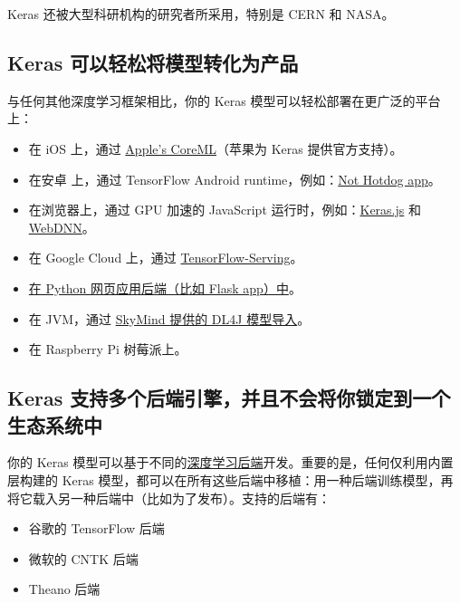 Keras 还被大型科研机构的研究者所采用，特别是 CERN 和 NASA。


\subsection{Keras
可以轻松将模型转化为产品}\label{keras-ux53efux4ee5ux8f7bux677eux5c06ux6a21ux578bux8f6cux5316ux4e3aux4ea7ux54c1}

与任何其他深度学习框架相比，你的 Keras
模型可以轻松部署在更广泛的平台上：

\begin{itemize}
\tightlist
\item
  在 iOS 上，通过
  \href{https://developer.apple.com/documentation/coreml}{Apple's
  CoreML}（苹果为 Keras 提供官方支持）。
\item
  在安卓 上，通过 TensorFlow Android
  runtime，例如：\href{https://medium.com/@timanglade/how-hbos-silicon-valley-built-not-hotdog-with-mobile-tensorflow-keras-react-native-ef03260747f3}{Not
  Hotdog app}。
\item
  在浏览器上，通过 GPU 加速的 JavaScript
  运行时，例如：\href{https://transcranial.github.io/keras-js/\#/}{Keras.js}
  和 \href{https://mil-tokyo.github.io/webdnn/}{WebDNN}。
\item
  在 Google Cloud 上，通过
  \href{https://www.tensorflow.org/serving/}{TensorFlow-Serving}。
\item
    \href{https://blog.keras.io/building-a-simple-keras-deep-learning-rest-api.html}{在 Python 网页应用后端（比如 Flask
  app）中}。
\item
  在 JVM，通过
  \href{https://deeplearning4j.org/model-import-keras}{SkyMind 提供的
  DL4J 模型导入}。
\item
  在 Raspberry Pi 树莓派上。
\end{itemize}


\subsection{Keras
支持多个后端引擎，并且不会将你锁定到一个生态系统中}\label{keras-ux652fux6301ux591aux4e2aux540eux7aefux5f15ux64ceux5e76ux4e14ux4e0dux4f1aux5c06ux4f60ux9501ux5b9aux5230ux4e00ux4e2aux751fux6001ux7cfbux7edfux4e2d}

你的 Keras
模型可以基于不同的\hyperref[keras-backend]{深度学习后端}开发。重要的是，任何仅利用内置层构建的
Keras
模型，都可以在所有这些后端中移植：用一种后端训练模型，再将它载入另一种后端中（比如为了发布）。支持的后端有：

\begin{itemize}
\tightlist
\item
  谷歌的 TensorFlow 后端
\item
  微软的 CNTK 后端
\item
  Theano 后端
\end{itemize}

